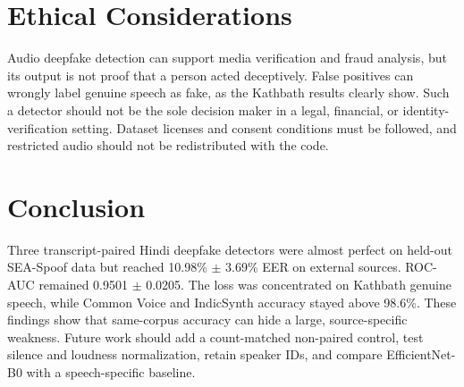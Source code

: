 \documentclass[conference]{IEEEtran}
\begin{document}
\section{Ethical Considerations}
Audio deepfake detection can support media verification and fraud analysis,
but its output is not proof that a person acted deceptively. False positives
can wrongly label genuine speech as fake, as the Kathbath results clearly
show. Such a detector should not be the sole decision maker in a legal,
financial, or identity-verification setting. Dataset licenses and consent
conditions must be followed, and restricted audio should not be
redistributed with the code.

\section{Conclusion}
Three transcript-paired Hindi deepfake detectors were almost perfect on
held-out SEA-Spoof data but reached 10.98\% $\pm$ 3.69\% EER on external
sources. ROC-AUC remained 0.9501 $\pm$ 0.0205. The loss was concentrated on
Kathbath genuine speech, while Common Voice and IndicSynth accuracy stayed
above 98.6\%. These findings show that same-corpus accuracy can hide a large,
source-specific weakness. Future work should add a count-matched non-paired
control, test silence and loudness normalization, retain speaker IDs, and
compare EfficientNet-B0 with a speech-specific baseline.



\end{document}
